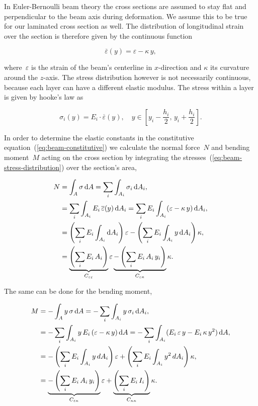 In Euler-Bernoulli beam theory the cross sections are assumed to stay flat and perpendicular to the beam axis during deformation.
We assume this to be true for our laminated cross section as well.
The distribution of longitudinal strain over the section is therefore given by the continuous function

\begin{equation}
\overline{\varepsilon}(y) = \varepsilon - \kappa\,y,
\end{equation}

where~$\varepsilon$ is the strain of the beam's centerline in $x$-direction and $\kappa$ its curvature around the $z$-axis.
The stress distribution however is not necessarily continuous, because each layer can have a different elastic modulus.
The stress within a layer is given by hooke's law as

\begin{equation}
\sigma_i(y) = E_i\cdot\overline{\varepsilon}(y),\quad y \in [y_i - \frac{h_i}{2},\,y_i + \frac{h_i}{2}].\label{eq:beam-stress-distribution}
\end{equation}

In order to determine the elastic constants in the constitutive equation~(\ref{eq:beam-constitutive}) we calculate the normal force~$N$ and bending moment~$M$ acting on the cross section by integrating the stresses~(\ref{eq:beam-stress-distribution}) over the section's area,

\begin{align}
N &= \int_A \sigma\,\mathrm{d}A = \sum_i\int_{A_i}\sigma_i\,\mathrm{d}A_i,\notag\\
&= \sum_i\int_{A_i}E_i\,\overline{\varepsilon}(y)\,\mathrm{d}A_i = \sum_i E_i \int_{A_i}(\varepsilon - \kappa\,y)\,\mathrm{d}A_i,\notag\\
&= \left(\sum_i E_i\int_{A_i}\mathrm{d}A_i\right)\varepsilon - \left(\sum_i E_i\int_{A_i}y\,\mathrm{d}A_i\right)\kappa,\notag\\
&=
\underbrace{
\left(\sum_i E_i\,A_i\right)
}_{C_{\varepsilon\varepsilon}}
\varepsilon
\underbrace{
- \left(\sum_i E_i\,A_i\,y_i\right)
}_{C_{\varepsilon\kappa}}
\kappa.\label{eq:elements:beam:constitutive_1}
\end{align}

The same can be done for the bending moment,

\begin{align}
M &= -\int_A y\,\sigma\,\mathrm{d}A = -\sum_i\int_{A_i}y\,\sigma_i\,\mathrm{d}A_i,\notag\\
&= -\sum_i\int_{A_i}y\,E_i\,(\varepsilon - \kappa\,y)\,\mathrm{d}A = -\sum_i\int_{A_i}(E_i\,\varepsilon\,y - E_i\,\kappa\,y^2)\,\mathrm{d}A,\notag\\
&= -\left(\sum_i E_i\int_{A_i}y\,dA_{i}\right)\varepsilon + \left(\sum_i E_i\int_{A_i}y^2\,dA_i\right)\kappa,\notag\\
&=
\underbrace{
-\left(\sum_i E_i\,A_i\,y_i\right)
}_{C_{\varepsilon\kappa}}
\varepsilon +
\underbrace{
\left(\sum_i E_i\,I_{i}\right)
}_{C_{\kappa\kappa}}
\kappa.\label{eq:elements:beam:constitutive_2}
\end{align}

